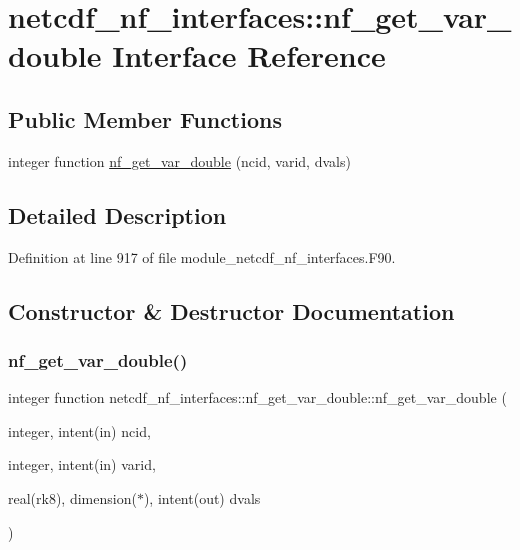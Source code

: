 \hypertarget{interfacenetcdf__nf__interfaces_1_1nf__get__var__double}{}\section{netcdf\+\_\+nf\+\_\+interfaces\+:\+:nf\+\_\+get\+\_\+var\+\_\+double Interface Reference}
\label{interfacenetcdf__nf__interfaces_1_1nf__get__var__double}
\subsection*{Public Member Functions}
\begin{DoxyCompactItemize}
\item 
integer function \hyperlink{interfacenetcdf__nf__interfaces_1_1nf__get__var__double_ab7c1665d2558135340d567edeb823ce1}{nf\+\_\+get\+\_\+var\+\_\+double} (ncid, varid, dvals)
\end{DoxyCompactItemize}


\subsection{Detailed Description}


Definition at line 917 of file module\+\_\+netcdf\+\_\+nf\+\_\+interfaces.\+F90.



\subsection{Constructor \& Destructor Documentation}
\mbox{\label{interfacenetcdf__nf__interfaces_1_1nf__get__var__double_ab7c1665d2558135340d567edeb823ce1}} 
\subsubsection{\texorpdfstring{nf\+\_\+get\+\_\+var\+\_\+double()}{nf\_get\_var\_double()}}
{\footnotesize\ttfamily integer function netcdf\+\_\+nf\+\_\+interfaces\+::nf\+\_\+get\+\_\+var\+\_\+double\+::nf\+\_\+get\+\_\+var\+\_\+double (\begin{DoxyParamCaption}\item[{integer, intent(in)}]{ncid,  }\item[{integer, intent(in)}]{varid,  }\item[{real(rk8), dimension($\ast$), intent(out)}]{dvals }\end{DoxyParamCaption})}



